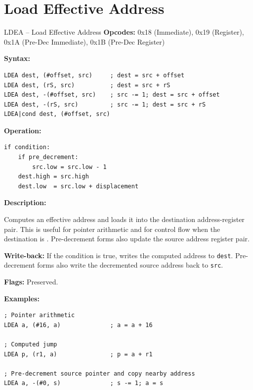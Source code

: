 \section{Load Effective Address}

\begin{instructionbox}{LDEA -- Load Effective Address}
	\textbf{Opcodes:} 0x18 (Immediate), 0x19 (Register), 0x1A (Pre-Dec Immediate), 0x1B (Pre-Dec Register)

	\textbf{Syntax:}
	\begin{lstlisting}
LDEA dest, (#offset, src)     ; dest = src + offset
LDEA dest, (rS, src)          ; dest = src + rS
LDEA dest, -(#offset, src)    ; src -= 1; dest = src + offset
LDEA dest, -(rS, src)         ; src -= 1; dest = src + rS
LDEA|cond dest, (#offset, src)
\end{lstlisting}

	\textbf{Operation:}
	\begin{verbatim}
if condition:
    if pre_decrement:
        src.low = src.low - 1
    dest.high = src.high
    dest.low  = src.low + displacement
\end{verbatim}

	\textbf{Description:}

	Computes an effective address and loads it into the destination address-register pair. This is useful for pointer
	arithmetic and for control flow when the destination is . Pre-decrement forms also update the source address
	register pair.

	\textbf{Write-back:} If the condition is true, writes the computed address to \texttt{dest}. Pre-decrement forms also
	write the decremented source address back to \texttt{src}.

	\textbf{Flags:} Preserved.

	\textbf{Examples:}
	\begin{lstlisting}
; Pointer arithmetic
LDEA a, (#16, a)              ; a = a + 16

; Computed jump
LDEA p, (r1, a)               ; p = a + r1

; Pre-decrement source pointer and copy nearby address
LDEA a, -(#0, s)              ; s -= 1; a = s
\end{lstlisting}

\end{instructionbox}

